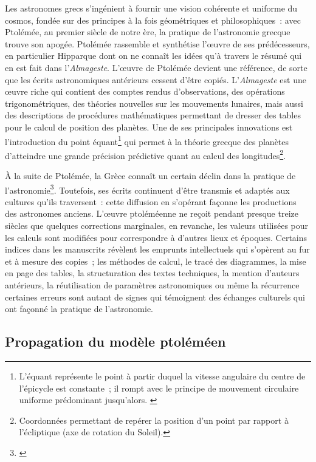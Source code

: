 \documentclass[a4paper,12pt,twoside]{book}
\begin{document}
Les astronomes grecs s'ingénient à fournir une vision cohérente et uniforme du cosmos, fondée sur des principes à la fois géométriques et philosophiques~: avec Ptolémée, au premier siècle de notre ère, la pratique de l'astronomie grecque trouve son apogée. Ptolémée rassemble et synthétise l'œuvre de ses prédécesseurs, en particulier Hipparque dont on ne connaît les idées qu'à travers le résumé qui en est fait dans l'\emph{Almageste}. L'œuvre de Ptolémée devient une référence, de sorte que les écrits astronomiques antérieurs cessent d'être copiés. L'\emph{Almageste} est une œuvre riche qui contient des comptes rendus d'observations, des opérations trigonométriques, des théories nouvelles sur les mouvements lunaires, mais aussi des descriptions de procédures mathématiques permettant de dresser des tables pour le calcul de position des planètes. Une de ses principales innovations est l'introduction du point équant\footnote{L'équant représente le point à partir duquel la vitesse angulaire du centre de l'épicycle est constante~; il rompt avec le principe de mouvement circulaire uniforme prédominant jusqu'alors. \cite{bessouLumieresUniversHistoire}} qui permet à la théorie grecque des planètes d'atteindre une grande précision prédictive quant au calcul des longitudes\footnote{Coordonnées permettant de repérer la position d'un point par rapport à l'écliptique (axe de rotation du Soleil).}.

À la suite de Ptolémée, la Grèce connaît un certain déclin dans la pratique de l'astronomie\footnote{\cite[p.~6]{mercierStudiesTransmissionMedieval2004}}. Toutefois, ses écrits continuent d'être transmis et adaptés aux cultures qu'ils traversent~: cette diffusion en s'opérant façonne les productions des astronomes anciens. L'œuvre ptoléméenne ne reçoit pendant presque treize siècles que quelques corrections marginales, en revanche, les valeurs utilisées pour les calculs sont modifiées pour correspondre à d'autres lieux et époques. Certains indices dans les manuscrits révèlent les emprunts intellectuels qui s'opèrent au fur et à mesure des copies~; les méthodes de calcul, le tracé des diagrammes, la mise en page des tables, la structuration des textes techniques, la mention d'auteurs antérieurs, la réutilisation de paramètres astronomiques ou même la récurrence certaines erreurs sont autant de signes qui témoignent des échanges culturels qui ont façonné la pratique de l'astronomie.

		\subsection{Propagation du modèle ptoléméen}
\end{document}
